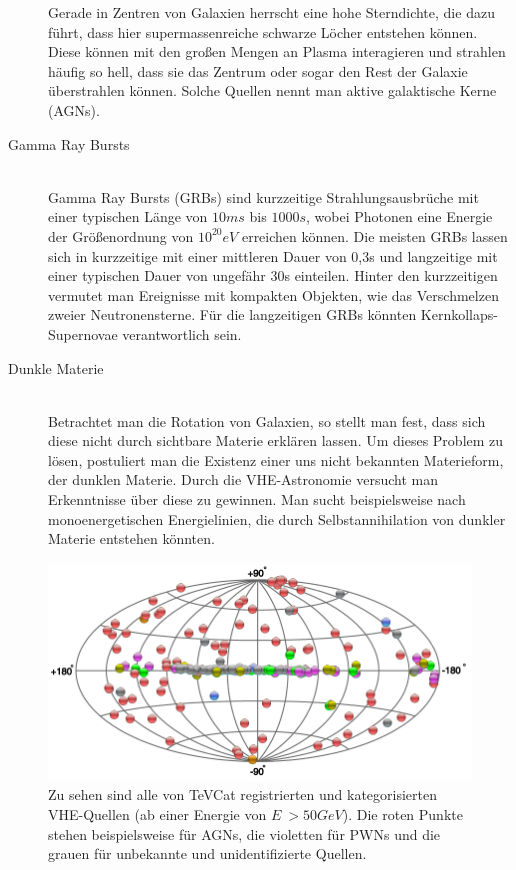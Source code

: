 \begin{description}
Gerade in Zentren von Galaxien herrscht eine hohe Sterndichte, die dazu führt, dass hier supermassenreiche schwarze Löcher entstehen können. Diese können mit den großen Mengen an Plasma interagieren und strahlen häufig so hell, dass sie das Zentrum oder sogar den Rest der Galaxie überstrahlen können. Solche Quellen nennt man aktive galaktische Kerne (AGNs).
\item[Gamma Ray Bursts]\hfill \\
Gamma Ray Bursts (GRBs) sind kurzzeitige Strahlungsausbrüche mit einer typischen Länge von $10\unit{ms}$ bis $1000\unit{s}$, wobei Photonen eine Energie der Größenordnung von $10^{20}\unit{eV}$ \cite{tevstat} erreichen können. %
Die meisten GRBs lassen sich in kurzzeitige mit einer mittleren Dauer von 0,3s und langzeitige mit einer typischen Dauer von ungefähr 30s einteilen. Hinter den kurzzeitigen vermutet man Ereignisse mit kompakten Objekten, wie das Verschmelzen zweier Neutronensterne. Für die langzeitigen GRBs könnten Kernkollaps-Supernovae verantwortlich sein.
\item[Dunkle Materie]\hfill \\
Betrachtet man die Rotation von Galaxien, so stellt man fest, dass sich diese nicht durch sichtbare Materie erklären lassen. Um dieses Problem zu lösen, postuliert man die Existenz einer uns nicht bekannten Materieform, der dunklen Materie. Durch die VHE-Astronomie versucht man Erkenntnisse über diese zu gewinnen. Man sucht beispielsweise nach monoenergetischen Energielinien, die durch Selbstannihilation von dunkler Materie entstehen könnten.
\end{description}

\begin{figure}[htbp]
\centering
\includegraphics[width=\textwidth]{Images/tevcat.png}
\caption{Zu sehen sind alle von TeVCat registrierten und kategorisierten VHE-Quellen (ab einer Energie von $E~>50\unit{GeV}$\cite{TeVCat2}). Die roten Punkte stehen beispielsweise für AGNs, die violetten für PWNs und die grauen für unbekannte und unidentifizierte Quellen. \cite{TevCat}}
\label{img:tevcat}
\end{figure}


